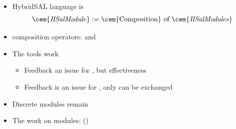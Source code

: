 \documentclass{seminar}
\begin{document}
\begin{slide}

{}

\begin{itemize}
\item
 HybridSAL language is {}
 \begin{eqnarray*}
  \mathit{{\cem{HSal Module}}} := \mbox{{\cem{Composition}} of } 
  \mathit{{\cem{HSal Modules}}}
 \end{eqnarray*}

\item
 {} composition operators:
 {} and {}

\item
 The {} tools work {}
 \begin{itemize}
 \item Feedback {} an issue for {},
 but {} effectiveness
 \item Feedback is an issue for {},
 only {} can be exchanged
 \end{itemize}

\item
 Discrete modules remain {}

\item
 The {} work on {} modules:
 ({})

\end{itemize}

\end{slide}
\end{document}
